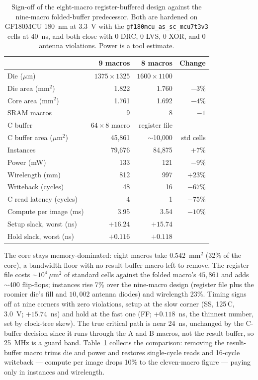 \documentclass[conference,a4paper]{APSIPA2026}
\begin{document}
\begin{table}[!ht]
\caption{Sign-off of the eight-macro register-buffered design against the nine-macro folded-buffer predecessor. Both are hardened on GF180MCU 180~nm at 3.3~V with the \texttt{gf180mcu\_as\_sc\_mcu7t3v3} cells at 40~ns, and both close with 0 DRC, 0 LVS, 0 XOR, and 0 antenna violations. Power is a tool estimate.}
\label{tab:vs9}
\centering
\renewcommand{\arraystretch}{1.0}
\begin{tabular}{@{}lrrr@{}}
\toprule
 & 9 macros & 8 macros & Change \\
\midrule
Die ($\mu$m)            & $1375{\times}1325$ & $1600{\times}1100$ & \\
Die area (mm$^2$)       & 1.822   & 1.760   & $-3\%$ \\
Core area (mm$^2$)      & 1.761   & 1.692   & $-4\%$ \\
SRAM macros             & 9       & 8       & $-1$ \\
C buffer                & $64{\times}8$ macro & register file & \\
C buffer area ($\mu$m$^2$) & 45{,}861 & $\sim$10{,}000 & std cells \\
Instances               & 79{,}676 & 84{,}875 & $+7\%$ \\
Power (mW)              & 133     & 121     & $-9\%$ \\
Wirelength (mm)         & 812     & 997     & $+23\%$ \\
Writeback (cycles)      & 48      & 16      & $-67\%$ \\
C read latency (cycles) & 4       & 1       & $-75\%$ \\
Compute per image (ms)  & 3.95    & 3.54    & $-10\%$ \\
Setup slack, worst (ns) & $+16.24$ & $+15.74$ & \\
Hold slack, worst (ns)  & $+0.116$ & $+0.118$ & \\
\bottomrule
\end{tabular}
\end{table}

The core stays memory-dominated: eight macros take $0.542$~mm$^2$ (32\% of the core), a bandwidth floor with no result-buffer macro left to remove. The register file costs $\sim$$10^4~\mu$m$^2$ of standard cells against the folded macro's $45{,}861$ and adds $\sim$400 flip-flops; instances rise 7\% over the nine-macro design (register file plus the roomier die's fill and $10{,}002$ antenna diodes) and wirelength 23\%. Timing signs off at nine corners with zero violations, setup at the slow corner (SS, 125\,\textdegree C, 3.0~V; $+15.74$~ns) and hold at the fast one (FF; $+0.118$~ns, the thinnest number, set by clock-tree skew). The true critical path is near 24~ns, unchanged by the C-buffer decision since it runs through the A and B macros, not the result buffer, so 25~MHz is a guard band. Table~\ref{tab:vs9} collects the comparison: removing the result-buffer macro trims die and power and restores single-cycle reads and 16-cycle writeback --- compute per image drops 10\% to the eleven-macro figure --- paying only in instances and wirelength.
\end{document}
